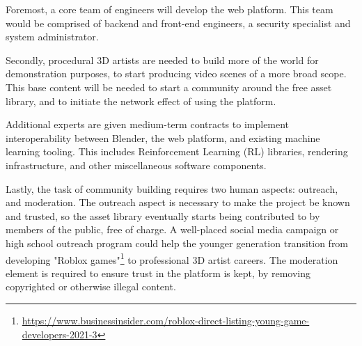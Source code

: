 Foremost, a core team of engineers will develop the web platform. This team would be comprised of backend and front-end engineers, a security specialist and system administrator.

Secondly, procedural 3D artists are needed to build more of the world for demonstration purposes, to start producing video scenes of a more broad scope. This base content will be needed to start a community around the free asset library, and to initiate the network effect of using the platform.

Additional experts are given medium-term contracts to implement interoperability between Blender, the web platform, and existing machine learning tooling. This includes Reinforcement Learning (RL) libraries, rendering infrastructure, and other miscellaneous software components.

Lastly, the task of community building requires two human aspects: outreach, and moderation. The outreach aspect is necessary to make the project be known and trusted, so the asset library eventually starts being contributed to by members of the public, free of charge. A well-placed social media campaign or high school outreach program could help the younger generation transition from developing "Roblox games"\footnote{\url{https://www.businessinsider.com/roblox-direct-listing-young-game-developers-2021-3}} to professional 3D artist careers. The moderation element is required to ensure trust in the platform is kept, by removing copyrighted or otherwise illegal content.


